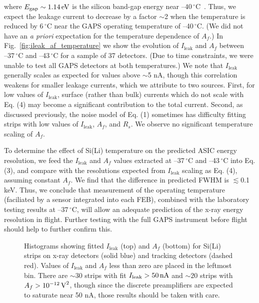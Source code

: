 \documentclass[journal]{IEEEtran}
\begin{document}
where $E_\text{gap} \sim 1.14 \text{\,eV}$ is the silicon band-gap energy near $\text{--40}\,^\circ\text{C}$~\cite{Bludau:1974a}. Thus, we expect the leakage current to decrease by a factor ${\sim}$2 when the temperature is reduced by $6\,^\circ\text{C}$ near the GAPS operating temperature of --40$\,^\circ\text{C}$. (We did not have an \textit{a priori} expectation for the temperature dependence of $A_f$.) In Fig.~\ref{fig:ileak_af_temperature} we show the evolution of $I_\text{leak}$ and $A_f$ between $\text{--37}\,^\circ\text{C}$ and --43$\,^\circ\text{C}$ for a sample of 37 detectors. (Due to time constraints, we were unable to test all GAPS detectors at both temperatures.) We note that $I_\text{leak}$ generally scales as expected for values above ${\sim}$5 nA, though this correlation weakens for smaller leakage currents, which we attribute to two sources. First, for low values of $I_\text{leak}$, surface (rather than bulk) currents which do not scale with Eq. (4) may become a significant contribution to the total current. Second, as discussed previously, the noise model of Eq. (1) sometimes has difficulty fitting strips with low values of $I_\text{leak}$, $A_f$, and $R_s$. We observe no significant temperature scaling of $A_f$.
%
\par To determine the effect of Si(Li) temperature on the predicted ASIC energy resolution, we feed the $I_\text{leak}$ and $A_f$ values extracted at --37$\,^\circ\text{C}$ and --43$\,^\circ\text{C}$ into Eq. (3), and compare with the resolutions expected from $I_\text{leak}$ scaling as Eq. (4), assuming constant $A_f$. We find that the difference in predicted FWHM is ${\lesssim}$0.1 keV. Thus, we conclude that measurement of the operating temperature (faciliated by a sensor integrated into each FEB), combined with the laboratory testing results at $\text{--37}\,^\circ\text{C}$, will allow an adequate prediction of the x-ray energy resolution in flight. Further testing with the full GAPS instrument before flight should help to further confirm this.
\begin{figure}[t]
    \centering
    
    
    
    
    \caption{Histograms showing fitted $I_\text{leak}$ (top) and $A_f$ (bottom) for Si(Li) strips on x-ray detectors (solid blue) and tracking detectors (dashed red). Values of $I_\text{leak}$ and $A_f$ less than zero are placed in the leftmost bin. There are ${\sim}$30 strips with fit $I_\text{leak} > 50\text{\,nA}$ and ${\sim}20$ strips with $A_f > 10^{-12}\text{\,V}^2$, though since the discrete preamplifiers are expected to saturate near 50 nA, those results should be taken with care.} 
    \label{fig:ileak_af_hist}
\end{figure}
\end{document}
